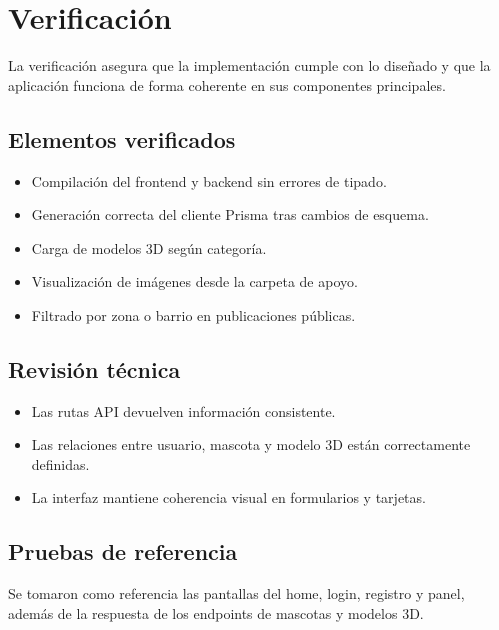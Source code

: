 \section{Verificaci\'on}

La verificaci\'on asegura que la implementaci\'on cumple con lo dise\~nado y que la aplicaci\'on funciona de forma coherente en sus componentes principales.

\subsection{Elementos verificados}
\begin{itemize}[leftmargin=*]
    \item Compilaci\'on del frontend y backend sin errores de tipado.
    \item Generaci\'on correcta del cliente Prisma tras cambios de esquema.
    \item Carga de modelos 3D seg\'un categor\'ia.
    \item Visualizaci\'on de im\'agenes desde la carpeta de apoyo.
    \item Filtrado por zona o barrio en publicaciones p\'ublicas.
\end{itemize}

\subsection{Revisi\'on t\'ecnica}
\begin{itemize}[leftmargin=*]
    \item Las rutas API devuelven informaci\'on consistente.
    \item Las relaciones entre usuario, mascota y modelo 3D est\'an correctamente definidas.
    \item La interfaz mantiene coherencia visual en formularios y tarjetas.
\end{itemize}

\subsection{Pruebas de referencia}
Se tomaron como referencia las pantallas del home, login, registro y panel, adem\'as de la respuesta de los endpoints de mascotas y modelos 3D.
